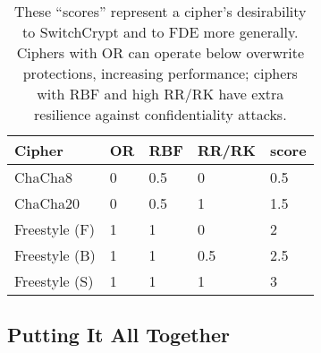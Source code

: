 \begin{table}[]
  \begin{tabular}{@{}lllll@{}}
  \toprule
  \textbf{Cipher} & \textbf{OR} & \textbf{RBF} & \textbf{RR/RK} & \textbf{score} \\ \midrule
  ChaCha8         & 0           & 0.5          & 0              & 0.5            \\
  ChaCha20        & 0           & 0.5          & 1              & 1.5            \\
  Freestyle (F)   & 1           & 1            & 0              & 2              \\
  Freestyle (B)   & 1           & 1            & 0.5            & 2.5            \\
  Freestyle (S)   & 1           & 1            & 1              & 3
  \end{tabular}
  \caption{These ``scores'' represent a cipher's desirability to SwitchCrypt and
  to FDE more generally. Ciphers with OR can operate below overwrite
  protections, increasing performance; ciphers with RBF and high RR/RK have
  extra resilience against confidentiality attacks.}
  \label{tbl:security-quant}
\end{table}

\subsection{Putting It All Together} \label{subsec:summary}

